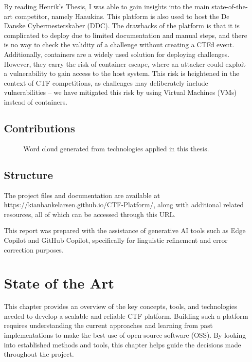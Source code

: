 By reading Henrik's Thesis, I was able to gain insights into the main state-of-the-art competitor, namely Haaukins. This platform is also used to host the De Danske Cybermesterskaber (DDC). The drawbacks of the platform is that it is complicated to deploy due to limited documentation and manual steps, and there is no way to check the validity of a challenge without creating a CTFd event. Additionally, containers are a widely used solution for deploying challenges. However, they carry the risk of container escape, where an attacker could exploit a vulnerability to gain access to the host system. This risk is heightened in the context of CTF competitions, as challenges may deliberately include vulnerabilities -- we have mitigated this risk by using Virtual Machines (VMs) instead of containers.

\section{Contributions} 

\begin{figure}
    \centering
    
    \caption{Word cloud generated from technologies applied in this thesis.}
    \label{fig:wordcloud}
\end{figure}

\section{Structure} 

The project files and documentation are available at \url{https://kianbankelarsen.github.io/CTF-Platform/}, along with additional related resources, all of which can be accessed through this URL.

This report was prepared with the assistance of generative AI tools such as Edge Copilot and GitHub Copilot, specifically for linguistic refinement and error correction purposes.

\chapter{State of the Art}

This chapter provides an overview of the key concepts, tools, and technologies needed to develop a scalable and reliable CTF platform. Building such a platform requires understanding the current approaches and learning from past implementations to make the best use of open-source software (OSS). By looking into established methods and tools, this chapter helps guide the decisions made throughout the project.

